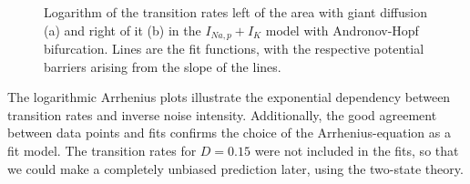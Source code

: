 \documentclass[12pt,a4paper]{article}
\begin{document}
\begin{figure}[H]
	\hspace*{-0.5cm}
	\caption{Logarithm of the transition rates left of the area with giant diffusion (a) and right of it (b) in the $I_{Na,p}+I_K$ model with Andronov-Hopf bifurcation. Lines are the fit functions, with the respective potential barriers arising from the slope of the lines. }
	\label{arrhplotsanhopf}
\end{figure}
The logarithmic Arrhenius plots illustrate the exponential dependency between transition rates and inverse noise intensity. Additionally, the good agreement between data points and fits confirms the choice of the Arrhenius-equation as a fit model. The transition rates for $D=0.15$ were not included in the fits, so that we could make a completely unbiased prediction later, using the two-state theory.\\
\end{document}
